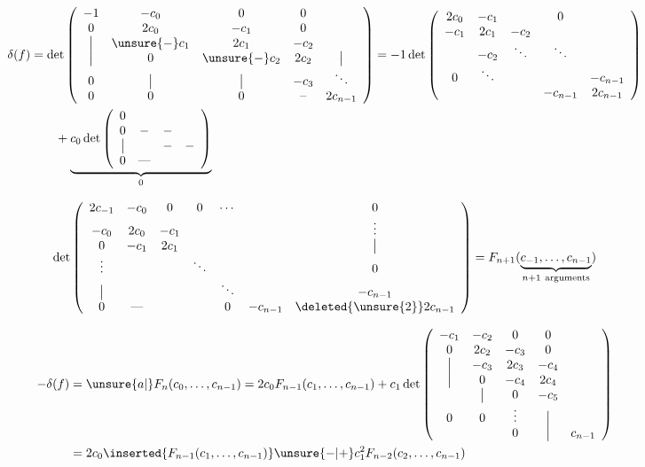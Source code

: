 \[
\begin{aligned}
\delta(f)&=\det\left(\begin{array}{ccccc}
-1&-c_0&0&0&\\
0&2c_0&-c_1&0&\\
\big|&\unsure{-}c_1&2c_1&-c_2&\\
\big|&0&\unsure{-}c_2&2c_2&\big|\\
0&\big|&\big|&-c_3&\ddots\\
0&0&0&\text{--}&2c_{n-1}
\end{array}\right)
=-1\det\left(\begin{array}{ccccc}
2c_0&-c_1&&0&\\
-c_1&2c_1&-c_2&&\\
&-c_2&\ddots&\ddots&\\
0&\ddots&&&-c_{n-1}\\
&&&-c_{n-1}&2c_{n-1}
\end{array}\right)\\
&\qquad{}+\underbrace{c_0\det\left(\begin{array}{cccc}0&&&\\0&-&-&\\\big|&&-&-\\0&\text{---}&&\end{array}\right)}_{0}
\end{aligned}
\]

\[
\det\left(\begin{array}{ccccccc}
2c_{-1}&-c_0&0&0&\cdots&&0\\
-c_0&2c_0&-c_1&&&&\vdots\\
0&-c_1&2c_1&&&&\big|\\
\vdots&&&\ddots&&&0\\
\big|&&&&\ddots&&-c_{n-1}\\
0&\text{---}&&&0&-c_{n-1}&\deleted{\unsure{2}}2c_{n-1}
\end{array}\right)
=F_{n+1}(\underbrace{c_{-1},\ldots,c_{n-1}}_{n+1\ \text{arguments}})
\]

\[
\begin{aligned}
-\delta(f)&=\unsure{a|{}}F_n(c_0,\ldots,c_{n-1})=2c_0F_{n-1}(c_1,\ldots,c_{n-1})+c_1\det
\left(\begin{array}{ccccc}
-c_1&-c_2&0&0&\\
0&2c_2&-c_3&0&\\
\big|&-c_3&2c_3&-c_4&\\
\big|&0&-c_4&2c_4&\\
&\big|&0&-c_5&\\
0&0&\vdots&\big|&\\
&&0&\big|&c_{n-1}
\end{array}\right)\\
&=2c_0\inserted{F_{n-1}(c_1,\ldots,c_{n-1})}\unsure{-|+}c_1^2F_{n-2}(c_2,\ldots,c_{n-1})
\end{aligned}
\]

